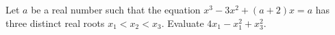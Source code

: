 Let $a$ be a real number such that the equation $x^3-3x^2+(a+2)x=a$ has three distinct real roots $x_1<x_2<x_3$. Evaluate $4x_1-x_1^2+x_3^2$.
